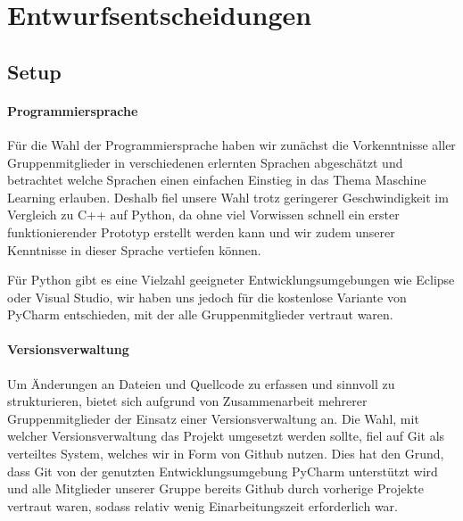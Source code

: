 \chapter{Entwurfsentscheidungen }
\label{ch:entwurf}

\section{Setup}

\subsubsection*{Programmiersprache}
Für die Wahl der Programmiersprache haben wir zunächst die Vorkenntnisse aller Gruppenmitglieder in verschiedenen erlernten Sprachen abgeschätzt und betrachtet welche Sprachen einen einfachen Einstieg in das Thema Maschine Learning erlauben. Deshalb fiel unsere Wahl trotz geringerer Geschwindigkeit im Vergleich zu C++ auf Python, da ohne viel Vorwissen schnell ein erster funktionierender Prototyp erstellt werden kann und wir zudem unserer Kenntnisse in dieser Sprache vertiefen können.

Für Python gibt es eine Vielzahl geeigneter Entwicklungsumgebungen wie Eclipse oder Visual Studio, wir haben uns jedoch für die kostenlose Variante von PyCharm entschieden, mit der alle Gruppenmitglieder vertraut waren.


\subsubsection*{Versionsverwaltung}
Um Änderungen an Dateien und Quellcode zu erfassen und sinnvoll zu strukturieren, bietet sich aufgrund von Zusammenarbeit mehrerer Gruppenmitglieder der Einsatz einer Versionsverwaltung an. Die Wahl, mit welcher Versionsverwaltung das Projekt umgesetzt werden sollte, fiel auf Git als verteiltes System, welches wir in Form von Github nutzen. Dies hat den Grund, dass Git von der genutzten Entwicklungsumgebung PyCharm unterstützt wird und alle Mitglieder unserer Gruppe bereits Github durch vorherige Projekte vertraut waren, sodass relativ wenig Einarbeitungszeit erforderlich war. 

